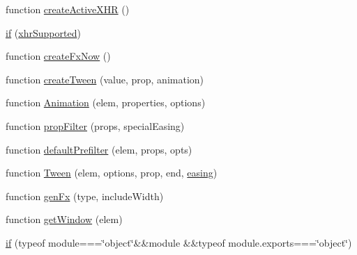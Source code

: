 \begin{DoxyCompactItemize}
function \hyperlink{obj_2_release_2_package_2_package_tmp_2_scripts_2jquery-1_810_82_8js_a54bf63f1b5f905292db45a1d6a9dc300}{create\+Active\+X\+H\+R} ()
\item 
\hyperlink{obj_2_release_2_package_2_package_tmp_2_scripts_2jquery-1_810_82_8js_ae2dd433d7bb020adf83db5351a0671e1}{if} (\hyperlink{_scripts_2jquery-1_810_82_8js_afd7e72f2f357a5a8b17e46776a6283eb}{xhr\+Supported})
\item 
function \hyperlink{obj_2_release_2_package_2_package_tmp_2_scripts_2jquery-1_810_82_8js_a3c7bcef859b0811abb1dbf890c6cc635}{create\+Fx\+Now} ()
\item 
function \hyperlink{obj_2_release_2_package_2_package_tmp_2_scripts_2jquery-1_810_82_8js_a0c2043fcd2fa684768877127fbbc2e55}{create\+Tween} (value, prop, animation)
\item 
function \hyperlink{obj_2_release_2_package_2_package_tmp_2_scripts_2jquery-1_810_82_8js_aa33f7dcb8ee41587d545a0bc69849296}{Animation} (elem, properties, options)
\item 
function \hyperlink{obj_2_release_2_package_2_package_tmp_2_scripts_2jquery-1_810_82_8js_a0196d1f08ae60b747901b5a2950f72f1}{prop\+Filter} (props, special\+Easing)
\item 
function \hyperlink{obj_2_release_2_package_2_package_tmp_2_scripts_2jquery-1_810_82_8js_a8041b1040535dcee84ad474aaaf11dde}{default\+Prefilter} (elem, props, opts)
\item 
function \hyperlink{obj_2_release_2_package_2_package_tmp_2_scripts_2jquery-1_810_82_8js_adcb517ce3709049d37bb5f5bd3811edf}{Tween} (elem, options, prop, end, \hyperlink{_scripts_2jquery-1_810_82_8js_a9758a312629fa6de1744280dd6e6253b}{easing})
\item 
function \hyperlink{obj_2_release_2_package_2_package_tmp_2_scripts_2jquery-1_810_82_8js_a0dad9ae6c57fd32a071de202faa87081}{gen\+Fx} (type, include\+Width)
\item 
function \hyperlink{obj_2_release_2_package_2_package_tmp_2_scripts_2jquery-1_810_82_8js_ab8e6e1fb3b8b51b6afe437c63df0e09f}{get\+Window} (elem)
\item 
\hyperlink{obj_2_release_2_package_2_package_tmp_2_scripts_2jquery-1_810_82_8js_aa2cebb51f03a2e3ab2af45a3f9241c96}{if} (typeof module===\char`\"{}object\char`\"{}\&\&module \&\&typeof module.\+exports===\char`\"{}object\char`\"{})
\end{DoxyCompactItemize}
